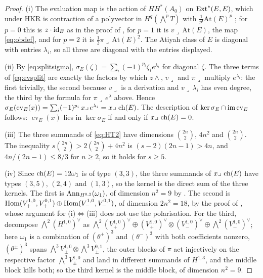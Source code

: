 \begin{proof}
(i) The evaluation map is the action of $HH^{*}(A_{0})$ on
$\operatorname{Ext}^{*}(E,E)$, which under HKR is contraction of a polyvector in
$H^{q}(\bigwedge^{p}T)$ with $\tfrac{1}{p!}\mathrm{At}(E)^{p}$
\cite{BF08}; for $p=0$ this is $z\cdot\operatorname{id}_{E}$ as in the proof of
\cite[Theorem~9.19]{paperI}, for $p=1$ it is $v\lrcorner\,\mathrm{At}(E)$, the map
\eqref{eq:obdef}, and for $p=2$ it is $\tfrac12\pi\lrcorner\,\mathrm{At}(E)^{2}$.
The Atiyah class of $E$ is diagonal with entries $\lambda_{i}$, so all three
are diagonal with the entries displayed.

(ii) By \eqref{eq:splitsigma}, $\sigma_{E}(\zeta)=\sum_{i}(-1)^{p_{i}}\zeta_{i}
e^{\lambda_{i}}$ for diagonal $\zeta$. The three terms of \eqref{eq:evsplit}
are exactly the factors by which $z\wedge$, $v\lrcorner$ and $\pi\lrcorner$
multiply $e^{\lambda_{i}}$: the first trivially, the second because
$v\lrcorner$ is a derivation and $v\lrcorner\,\lambda_{i}$ has even degree,
the third by the formula for $\pi\lrcorner\,e^{\lambda}$ above. Hence
$\sigma_{E}(\operatorname{ev}_{E}(x))=\sum_{i}(-1)^{p_{i}}\,x\lrcorner\,
e^{\lambda_{i}}=x\lrcorner\,\operatorname{ch}(E)$. The description of
$\ker\sigma_{E}\cap\operatorname{im}\operatorname{ev}_{E}$ follows: $\operatorname{ev}_{E}(x)$
lies in $\ker\sigma_{E}$ if and only if $x\lrcorner\,\operatorname{ch}(E)=0$.

(iii) The three summands of \eqref{eq:HT2} have dimensions $\binom{2n}{2}$,
$4n^{2}$ and $\binom{2n}{2}$. The inequality
$s\binom{2n}{2}>2\binom{2n}{2}+4n^{2}$ is $(s-2)(2n-1)>4n$, and
$4n/(2n-1)\le8/3$ for $n\ge2$, so it holds for $s\ge5$.

(iv) Since $\operatorname{ch}(E)=12\omega_{1}$ is of type $(3,3)$, the three summands of
$x\lrcorner\,\operatorname{ch}(E)$ have types $(3,5)$, $(2,4)$ and $(1,3)$, so the kernel
is the direct sum of the three kernels. The first is $\operatorname{Ann}_{H^{0,2}}(\omega_{1})$,
of dimension $n^{2}=9$ by \cite[Lemma~9.6]{paperI}. The second is
$\operatorname{Hom}(V_{+}^{1,0},V_{+}^{0,1})\oplus\operatorname{Hom}(V_{-}^{1,0},V_{-}^{0,1})$, of
dimension $2n^{2}=18$, by the proof of \cite[Proposition~9.14]{paperI}, whose
argument for (i)$\Leftrightarrow$(iii) does not use the polarisation. For the
third, decompose $\bigwedge^{2}(H^{1,0})^{\vee}$ as
$\bigwedge^{2}(V_{+}^{1,0})^{\vee}\oplus(V_{+}^{1,0})^{\vee}\otimes(V_{-}^{1,0})^{\vee}
\oplus\bigwedge^{2}(V_{-}^{1,0})^{\vee}$; here $\omega_{1}$ is a combination
of $(\theta^{+})^{3}$ and $(\theta^{-})^{3}$ with both coefficients nonzero,
$(\theta^{\pm})^{3}$ spans $\bigwedge^{3}V_{\pm}^{1,0}\otimes\bigwedge^{3}V_{\pm}^{0,1}$,
the outer blocks of $\pi$ act injectively on the respective factor
$\bigwedge^{3}V_{\pm}^{1,0}$ and land in different summands of $H^{1,3}$,
and the middle block kills both; so the third kernel is the middle block,
of dimension $n^{2}=9$.


\end{proof}
